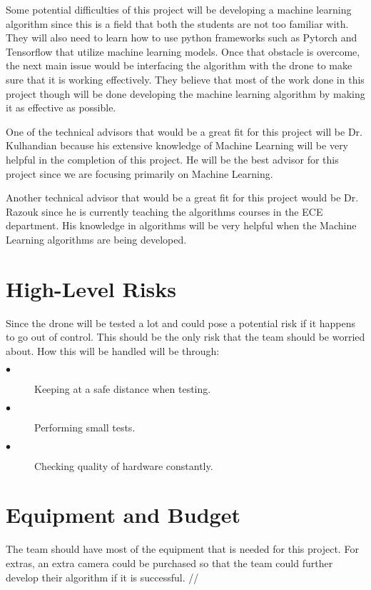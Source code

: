 \documentclass[12pt,onecolumn]{IEEEtran}			%
\begin{document}
Some potential difficulties of this project will be developing a machine learning algorithm since this is a field that both the students are not too familiar with. They will also need to learn how to use python frameworks such as Pytorch and Tensorflow that utilize machine learning models. Once that obstacle is overcome, the next main issue would be interfacing the algorithm with the drone to make sure that it is working effectively. They believe that most of the work done in this project though will be done developing the machine learning algorithm by making it as effective as possible. 

One of the technical advisors that would be a great fit for this project will be Dr. Kulhandian because his extensive knowledge of Machine Learning will be very helpful in the completion of this project. He will be the best advisor for this project since we are focusing primarily on Machine Learning.

Another technical advisor that would be a great fit for this project would be Dr. Razouk since he is currently teaching the algorithms courses in the ECE department. His knowledge in algorithms will be very helpful when the Machine Learning algorithms are being developed. 



\section{High-Level Risks}
Since the drone will be tested a lot and could pose a potential risk if it happens to go out of control. This should be the only risk that the team should be worried about. How this will be handled will be through: 
\vspace{12pt} 
 \begin{description}
  \item[$\bullet$ ] Keeping at a safe distance when testing. 
  \item[$\bullet$ ] Performing small tests. 
  \item[$\bullet$ ] Checking quality of hardware constantly. 
\end{description}



\section{Equipment and Budget}
The team should have most of the equipment that is needed for this project. For extras, an extra camera could be purchased so that the team could further develop their algorithm if it is successful. //
\vspace{12pt} 
\end{document}
